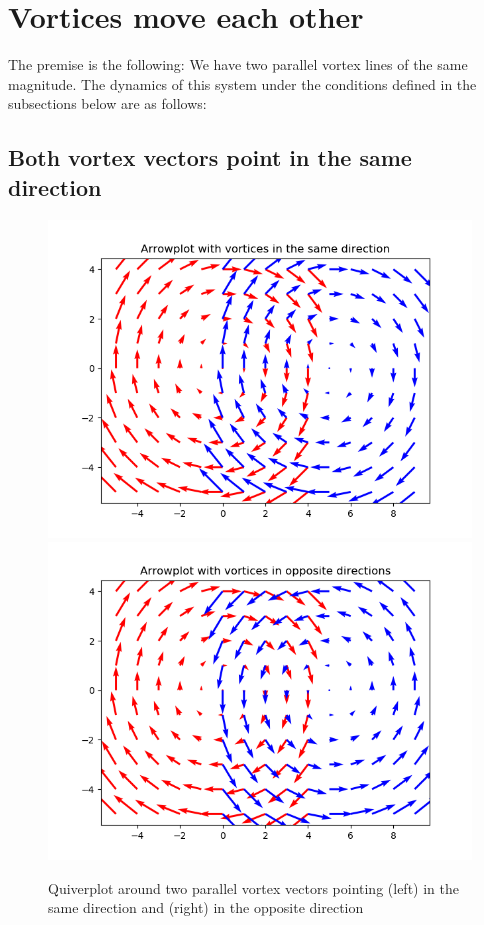 \documentclass[english]{article}
\begin{document}
\section{Vortices move each other}
The premise is the following: We have two parallel vortex lines of the same
magnitude. The dynamics of this system under the conditions defined in the
subsections below are as follows:
\subsection{Both vortex vectors point in the same direction}
\begin{figure}
	\centering
	\includegraphics[scale=0.45]{same_direction.png}\includegraphics[scale=0.45]{opposite_direction.png}
	\caption{Quiverplot around two parallel vortex vectors pointing (left) 
	in the same direction and (right) in the opposite direction}
	\label{fig:vortices}
\end{figure}
\end{document}
